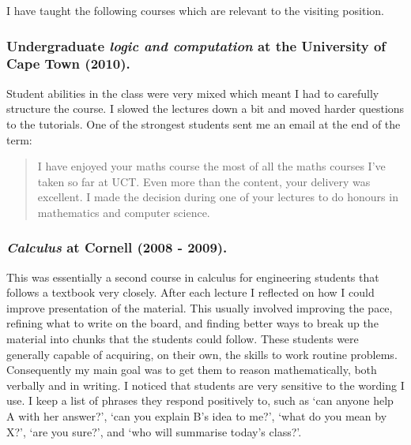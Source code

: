 \documentclass{article}[12pt]
\theoremstyle{plain} \numberwithin{equation}{section}
\theoremstyle{definition}
\begin{document}
\thispagestyle{fancy}

I have taught the following courses which are relevant to the visiting position.

\subsubsection{Undergraduate {\em logic and computation} at the University of Cape Town (2010).}

Student abilities in the class were very mixed which meant I had to carefully structure the course. I slowed the lectures down a bit and moved harder questions to the tutorials. One of the strongest students sent me an email at the end of the term:
\begin{quote}
I have enjoyed your maths course the most of all the maths courses I've taken so far at UCT. Even more than the content, your delivery was excellent.
I made the decision during one of your lectures to do honours in mathematics and computer science. 
\end{quote}

\subsubsection{{\em Calculus} at Cornell (2008 - 2009).}
This was essentially a second course in calculus for engineering students that follows a textbook very closely.
After each lecture I reflected on how I could improve presentation of the material. This usually involved improving the pace, refining what to write on the board, and finding better ways to break up the material into chunks that the students could follow. These students were generally capable of acquiring, on their own, the skills to work routine problems.
Consequently my main goal  was to get them to reason mathematically, both verbally and in writing. 
I noticed that students are very sensitive to the wording I use.
I keep a list of phrases they respond positively to, such as  `can anyone help A with her answer?', `can you explain B's idea to me?', `what do you mean by X?',
`are you sure?',  and `who will summarise today's class?'.

\end{document}
